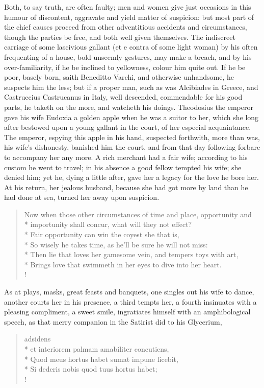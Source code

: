 Both, to say truth, are often faulty; men and women give just occasions
in this humour of discontent, aggravate and yield matter of suspicion:
but most part of the chief causes proceed from other adventitious
accidents and circumstances, though the parties be free, and both well
given themselves. The indiscreet carriage of some lascivious gallant
(et e contra of some light woman) by his often frequenting of a house,
bold unseemly gestures, may make a breach, and by his over-familiarity,
if he be inclined to yellowness, colour him quite out. If he be poor,
basely born, saith Beneditto Varchi, and otherwise unhandsome, he
suspects him the less; but if a proper man, such as was Alcibiades in
Greece, and Castruccius Castrucanus in Italy, well descended,
commendable for his good parts, he taketh on the more, and watcheth his
doings. Theodosius the emperor gave his wife Eudoxia a golden
apple when he was a suitor to her, which she long after bestowed upon a
young gallant in the court, of her especial acquaintance. The emperor,
espying this apple in his hand, suspected forthwith, more than was, his
wife's dishonesty, banished him the court, and from that day following
forbare to accompany her any more. A rich merchant had a fair
wife; according to his custom he went to travel; in his absence a good
fellow tempted his wife; she denied him; yet he, dying a little after,
gave her a legacy for the love he bore her. At his return, her jealous
husband, because she had got more by land than he had done at sea,
turned her away upon suspicion.

\begin{verse}%
Now when those other circumstances of time and place, opportunity and\\*
importunity shall concur, what will they not effect?\\*
Fair opportunity can win the coyest she that is,\\*
So wisely he takes time, as he'll be sure he will not miss:\\*
Then lie that loves her gamesome vein, and tempers toys with art,\\*
Brings love that swimmeth in her eyes to dive into her heart.\\!
\end{verse}%

As at plays, masks, great feasts and banquets, one singles out his wife
to dance, another courts her in his presence, a third tempts her, a
fourth insinuates with a pleasing compliment, a sweet smile,
ingratiates himself with an amphibological speech, as that merry
companion in the Satirist did to his Glycerium,
%
\begin{latin}%
\begin{verse}%
adsidens\\*
et interiorem palmam amabiliter concutiens,\\*
Quod meus hortus habet sumat impune licebit,\\*
Si dederis nobis quod tuus hortus habet;\\!
\end{verse}%
\end{latin}%

